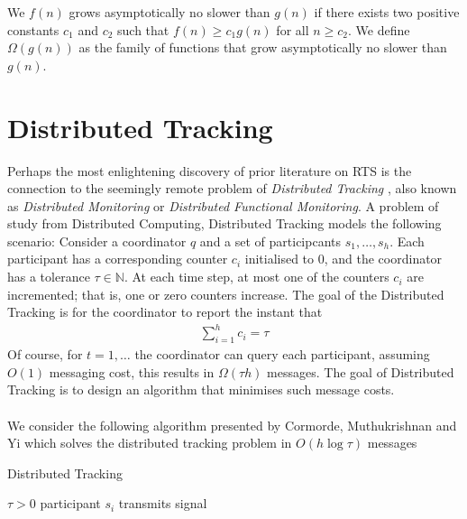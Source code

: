 \begin{definition}
    We $f(n)$ grows asymptotically no slower than $g(n)$ if there exists two positive constants $c_1$ and $c_2$ such that $f(n)\geq c_1 g(n)$ for all $n\geq c_2$. We define $\Omega(g(n))$ as the family of functions that grow asymptotically no slower than $g(n)$.
\end{definition}



\newpage

\section{Distributed Tracking}

Perhaps the most enlightening discovery of prior literature on RTS is the connection to the seemingly remote problem of \textit{Distributed Tracking} \cite{Cormode2011}, also known as \textit{Distributed Monitoring} or \textit{Distributed Functional Monitoring}. A problem of study from Distributed Computing, Distributed Tracking models the following scenario: Consider a coordinator $q$ and a set of participcants $s_1, \dots, s_h$. Each participant has a corresponding counter $c_i$ initialised to 0, and the coordinator has a tolerance $\tau\in\mathbb{N}$. At each time step, at most one of the counters $c_i$ are incremented; that is, one or zero counters increase.  The goal of the Distributed Tracking is for the coordinator to report the instant that 
\begin{align}
    \sum_{i=1}^{h}c_i = \tau
\end{align}
Of course, for $t=1,\dots$ the coordinator can query each participant, assuming $O(1)$ messaging cost, this results in  $\Omega(\tau h)$ messages. The goal of Distributed Tracking is to design an algorithm that minimises such message costs. \\
\\
We consider the following algorithm presented by Cormorde, Muthukrishnan and Yi \cite{Cormode} which solves the distributed tracking problem in $O(h\log \tau)$ messages

\begin{algorithm}
\caption{Distributed Tracking }\label{Algorithm 1}
\begin{algorithmic}
\Require $\tau > 0$
    \State {}
    \State {} 
    \State {}
     
            \State participant $s_i$ transmits signal
        \EndIf
    \EndFor
\EndIf
\end{algorithmic}
\end{algorithm}



